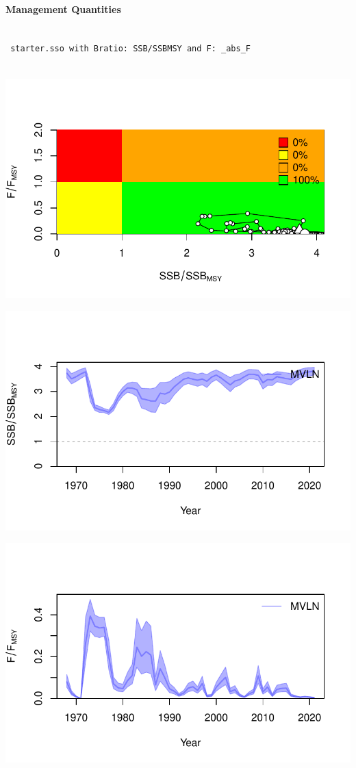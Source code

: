 \documentclass[
  letterpaper,
  DIV=11,
  numbers=noendperiod]{scrartcl}
\let\oldparagraph\paragraph
\renewcommand{\paragraph}[1]{\oldparagraph{#1}\mbox{}}
\begin{document}
\hypertarget{management-quantities}{%
\paragraph{Management Quantities}\label{management-quantities}}

\begin{verbatim}

 starter.sso with Bratio: SSB/SSBMSY and F: _abs_F 
 
\end{verbatim}

\includegraphics{LUKA_50_Base_model_diags_report_files/figure-pdf/mvlnkb-1.pdf}

\includegraphics{LUKA_50_Base_model_diags_report_files/figure-pdf/mvlnkb-2.pdf}

\includegraphics{LUKA_50_Base_model_diags_report_files/figure-pdf/mvlnkb-3.pdf}
\end{document}
